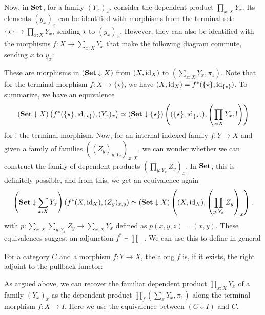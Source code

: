 Now, in $ \mathbf{Set} $, for a family $ (Y_x)_x $, consider the dependent product $ \prod_{x : X} Y_x $. Its elements $ (y_x)_x $ can be identified with morphisms from the terminal set: $ \{ \star \} \to \prod_{x : X} Y_x $, sending $ \star $ to $ (y_x)_x $. However, they can also be identified with the morphisms $ f: X \to \sum_{x : X} Y_x $ that make the following diagram commute, sending $ x $ to $ y_x $:
\begin{center}
\end{center}
These are morphisms in $ (\mathbf{Set} \downarrow X) $ from $ (X, \text{id}_{X}) $ to $ (\sum_{x : X} Y_x, \pi_1) $. Note that for the terminal morphism $ f: X \to \{ \star \} $, we have $ (X, \text{id}_{X}) = f^*(\{\star\}, \text{id}_{\{\star\}}) $. To summarize, we have an equivalence
\[ (\mathbf{Set} \downarrow X)\left(f^*(\{ \star \}, \text{id}_{\{\star\}}), (Y_x)_x \right) \simeq (\mathbf{Set} \downarrow {\{\star\}})\left( (\{\star\}, \text{id}_{\{ \star \}}), \left( \prod_{x : X} Y_x, ! \right) \right) \]
for $ ! $ the terminal morphism. Now, for an internal indexed family $ f : Y \to X $ and given a family of families $ ((Z_y)_{y : Y_x})_{x : X} $, we can wonder whether we can construct the family of dependent products $ (\prod_{y : Y_x} Z_y)_x $. In $ \mathbf{Set} $, this is definitely possible, and from this, we get an equivalence again
\[ \left(\mathbf{Set} \downarrow \sum_{x : X} Y_x \right)\left(f^*(X, \text{id}_{X}), (Z_y)_{x, y} \right) \simeq (\mathbf{Set} \downarrow X)\left((X, \text{id}_{X}), \left(\prod_{y : Y_x} Z_y\right)_x\right). \]
with $ p : \sum_{x : X} \sum_{y : Y_x} Z_y \to \sum_{x : X} Y_x $ defined as $ p(x, y, z) = (x, y) $. These equivalences suggest an adjunction $ f^* \dashv \prod_{\dots} $. We can use this to define in general
\begin{definition}
  For a category $ C $ and a morphism $ f: Y \to X $, the  along $ f $ is, if it exists, the right adjoint to the pullback functor:
  \begin{center}
  \end{center}
\end{definition}
\begin{remark}
  As argued above, we can recover the familiar dependent product $ \prod_{x : X} Y_x $ of a family $ (Y_x)_x $ as the dependent product $ \prod_f (\sum_x Y_x, \pi_1) $ along the terminal morphism $ f: X \to I $. Here we use the equivalence between $ (C \downarrow I) $ and $ C $.
\end{remark}

